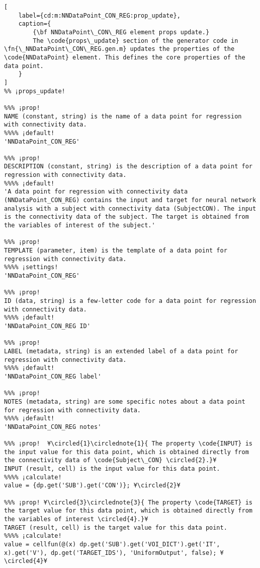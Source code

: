 \documentclass{tufte-handout}
\begin{document}
\begin{lstlisting}[
	label={cd:m:NNDataPoint_CON_REG:prop_update},
	caption={
		{\bf NNDataPoint\_CON\_REG element props update.}
		The \code{props\_update} section of the generator code in \fn{\_NNDataPoint\_CON\_REG.gen.m} updates the properties of the \code{NNDataPoint} element. This defines the core properties of the data point.
	}
]
%% ¡props_update!

%%% ¡prop!
NAME (constant, string) is the name of a data point for regression with connectivity data.
%%%% ¡default!
'NNDataPoint_CON_REG'

%%% ¡prop!
DESCRIPTION (constant, string) is the description of a data point for regression with connectivity data.
%%%% ¡default!
'A data point for regression with connectivity data (NNDataPoint_CON_REG) contains the input and target for neural network analysis with a subject with connectivity data (SubjectCON). The input is the connectivity data of the subject. The target is obtained from the variables of interest of the subject.'

%%% ¡prop!
TEMPLATE (parameter, item) is the template of a data point for regression with connectivity data.
%%%% ¡settings!
'NNDataPoint_CON_REG'

%%% ¡prop!
ID (data, string) is a few-letter code for a data point for regression with connectivity data.
%%%% ¡default!
'NNDataPoint_CON_REG ID'

%%% ¡prop!
LABEL (metadata, string) is an extended label of a data point for regression with connectivity data.
%%%% ¡default!
'NNDataPoint_CON_REG label'

%%% ¡prop!
NOTES (metadata, string) are some specific notes about a data point for regression with connectivity data.
%%%% ¡default!
'NNDataPoint_CON_REG notes'

%%% ¡prop!  ¥\circled{1}\circlednote{1}{ The property \code{INPUT} is the input value for this data point, which is obtained directly from the connectivity data of \code{Subject\_CON} \circled{2}.}¥
INPUT (result, cell) is the input value for this data point.
%%%% ¡calculate!
value = {dp.get('SUB').get('CON')}; ¥\circled{2}¥
    
%%% ¡prop! ¥\circled{3}\circlednote{3}{ The property \code{TARGET} is the target value for this data point, which is obtained directly from the variables of interest \circled{4}.}¥
TARGET (result, cell) is the target value for this data point.
%%%% ¡calculate!
value = cellfun(@(x) dp.get('SUB').get('VOI_DICT').get('IT', x).get('V'), dp.get('TARGET_IDS'), 'UniformOutput', false); ¥\circled{4}¥
\end{lstlisting}
\end{document}
